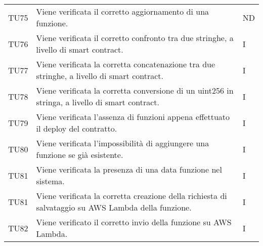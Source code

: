 \begin{longtable}{|C{1.5cm}|C{10cm}|C{1.5cm}|}
	TU75 &
	Viene verificata il corretto aggiornamento di una funzione.  &
	ND \\
	
	TU76 &
	Viene verificata il corretto confronto tra due stringhe, a livello di smart contract.  &
	I \\
	
	TU77 &
	Viene verificata la corretta concatenazione tra due stringhe, a livello di smart contract.  &
	I \\
	
	TU78 &
	Viene verificata la corretta conversione di un uint256 in stringa, a livello di smart contract.  &
	I \\
	
	TU79 &
	Viene verificata l'assenza di funzioni appena effettuato il deploy del contratto.  &
	I \\
	
	TU80 &
	Viene verificata l'impossibilità di aggiungere una funzione se già esistente.  &
	I \\
	
	TU81 &
	Viene verificata la presenza di una data funzione nel sistema.  &
	I \\
	
	TU81 &
	Viene verificata la corretta creazione della richiesta di salvataggio su AWS Lambda della funzione.  &
	I \\
	
	TU82 &
	Viene verificato il corretto invio della funzione su AWS Lambda.  &
	I \\
	
	
\end{longtable}